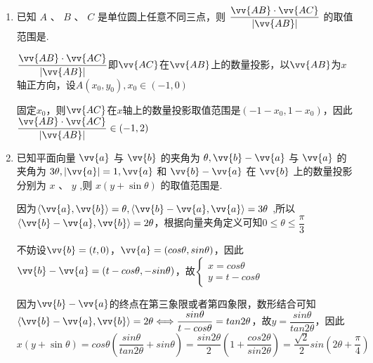 \begin{enumerate}
\begin{enumerate}
\begin{jieda}
            由 $\theta  \in  \left( {\dfrac{3}{2}\pi ,{2\pi }}\right) ,\theta  + \dfrac{\pi }{4} \in  \left( {\dfrac{7}{4}\pi ,\dfrac{9}{4}\pi }\right)$ ,
            
            则 $\sin \left( {\theta  + \dfrac{\pi }{4}}\right)  \in  \left( {-\dfrac{\sqrt{2}}{2},\dfrac{\sqrt{2}}{2}}\right) ,2\sqrt{2}\sin \left( {\theta  + \dfrac{\pi }{4}}\right)  \in  \left( {-2,2}\right)$
            
            故 $\left| {\vv{a} + \vv{b} + \vv{c}}\right|  \in  \left( {1,\sqrt{5}}\right)$ .
        \end{jieda}
        \item 已知 $A$ 、 $B$ 、 $C$ 是单位圆上任意不同三点，则 $\dfrac{\vv{AB} \cdot  \vv{AC}}{\left| \vv{AB}\right| }$ 的取值范围是.
        \begin{jieda}
            $\dfrac{\vv{AB} \cdot  \vv{AC}}{\left| \vv{AB}\right| }$即$\vv{AC}$在$\vv{AB}$上的数量投影，以$\vv{AB}$为$x$轴正方向，设$A(x_0, y_0), x_0 \in (-1, 0)$
            
            固定$x_0$，则$\vv{AC}$在$x$轴上的数量投影取值范围是$(-1-x_0, 1-x_0)$，因此$\dfrac{\vv{AB} \cdot  \vv{AC}}{\left| \vv{AB}\right| } \in \left( {-1,2}\right)$
        \end{jieda}
        \item 已知平面向量 $\vv{a}$ 与 $\vv{b}$ 的夹角为 $\theta ,\vv{b} - \vv{a}$ 与 $\vv{a}$ 的夹角为 ${3\theta },\left| \vv{a}\right|  = 1,\vv{a}$ 和 $\vv{b} - \vv{a}$ 在 $\vv{b}$ 上的数量投影分别为 $x\text{ 、 }y$ ,则 $x\left( {y + \sin \theta }\right)$ 的取值范围是.
        \begin{jieda}
            因为$\langle\vv{a}, \vv{b}\rangle = \theta, \langle\vv{b} - \vv{a}, \vv{a}\rangle = 3\theta$ ,所以 $\langle\vv{b} - \vv{a}, \vv{b}\rangle = 2\theta$，根据向量夹角定义可知$0 \leq  \theta  \leq  \dfrac{\pi }{3}$

            不妨设$\vv{b} = (t, 0)$，$\vv{a} = (cos\theta, sin\theta)$，因此$\vv{b} - \vv{a} = (t-cos\theta, -sin\theta)$，故$\left\{\begin{array}{l}
                x = cos\theta \\
                y = t - cos\theta
            \end{array}\right.$

            因为$\vv{b} - \vv{a}$的终点在第三象限或者第四象限，数形结合可知$\langle\vv{b} - \vv{a}, \vv{b}\rangle = 2\theta \Longleftrightarrow \dfrac{sin\theta}{t-cos\theta} = tan2\theta$，故$y = \dfrac{sin\theta}{tan2\theta}$，因此$x\left( {y + \sin \theta }\right) = cos\theta\left(\dfrac{sin\theta}{tan2\theta} + sin\theta\right) = \dfrac{sin2\theta}{2}\left(1 + \dfrac{cos2\theta}{sin2\theta}\right) = \dfrac{\sqrt{2}}{2}sin\left(2\theta + \dfrac{\pi}{4}\right)$


\end{jieda}
\end{enumerate}
\end{enumerate}
